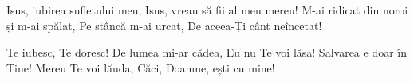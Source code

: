 \beginverse
Isus, iubirea sufletului meu,
Isus, vreau să fii al meu mereu!
M-ai ridicat din noroi și m-ai spălat,
Pe stâncă m-ai urcat,
De aceea-Ți cânt neîncetat!
\endverse

\beginchorus
Te iubesc, Te doresc!
De lumea mi-ar cădea,
Eu nu Te voi lăsa!
Salvarea e doar în Tine!
Mereu Te voi lăuda,
Căci, Doamne, ești cu mine!
\endchorus
\endsong